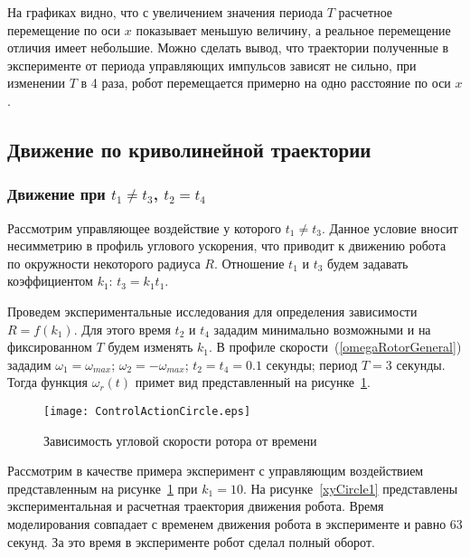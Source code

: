 На графиках видно, что с увеличением значения периода $ T $ расчетное перемещение по оси $ x $ показывает меньшую величину, а реальное перемещение отличия имеет небольшие. Можно сделать вывод, что траектории полученные в эксперименте от периода управляющих импульсов зависят не сильно, при изменении $ T $ в 4 раза, робот перемещается примерно на одно расстояние по оси $ x $.



\subsection{Движение по криволинейной траектории}

\subsubsection{Движение при $ t_1 \neq t_3 $, $ t_2 = t_4 $ }

Рассмотрим управляющее воздействие у которого $ t_1 \neq t_3 $. Данное условие вносит несимметрию в профиль углового ускорения, что приводит к движению робота по окружности некоторого радиуса $ R $. Отношение $ t_1 $ и $t_3 $ будем задавать коэффициентом $ k_1 $: $ t_3 = k_1t_1 $.	

Проведем экспериментальные исследования для определения зависимости $ R = f(k_1) $. Для этого время $ t_2 $ и $ t_4 $ зададим минимально возможными и на фиксированном $ T $ будем изменять $k_1$. В профиле скорости~(\ref{omegaRotorGeneral}) зададим $ \omega_1 = \omega_{max} $; $ \omega_2 = -\omega_{max} $; $ t_2=t_4=0.1 $ секунды; период $ T = 3 $ секунды. Тогда функция $ \omega_r(t) $ примет вид представленный на рисунке~\ref{ControlActionCircle1}.

\begin{figure}[!ht]
	\centering
	\texttt{[image: ControlActionCircle.eps]}
	\caption{Зависимость угловой скорости ротора от времени}
	\label{ControlActionCircle1}
\end{figure}

Рассмотрим в качестве примера эксперимент с управляющим воздействием представленным на рисунке~\ref{ControlActionCircle1} при $ k_1 = 10 $. На рисунке~\ref{xyCircle1} представлены экспериментальная и расчетная траектория движения робота. Время моделирования совпадает с временем движения робота в эксперименте и равно 63 секунд. За это время в эксперименте робот сделал полный оборот.


